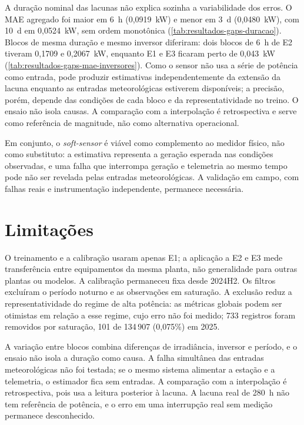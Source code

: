 A duração nominal das lacunas não explica sozinha a variabilidade dos erros. O
MAE agregado foi maior em 6~h (0,0919~kW) e menor em 3~d (0,0480~kW), com 10~d em
0,0524~kW, sem ordem monotônica (\cref{tab:resultados-gaps-duracao}). Blocos de
mesma duração e mesmo inversor diferiram: dois blocos de 6~h de E2 tiveram 0,1709
e 0,2067~kW, enquanto E1 e E3 ficaram perto de 0,043~kW
(\cref{tab:resultados-gaps-mae-inversores}). Como o sensor não usa a série de
potência como entrada, pode produzir estimativas independentemente da extensão da
lacuna enquanto as entradas meteorológicas estiverem disponíveis; a precisão,
porém, depende das condições de cada bloco e da representatividade no treino. O
ensaio não isola causas. A comparação com a interpolação é retrospectiva e serve
como referência de magnitude, não como alternativa operacional.

Em conjunto, o \textit{soft-sensor} é viável como complemento ao medidor físico,
não como substituto: a estimativa representa a geração esperada nas condições
observadas, e uma falha que interrompa geração e telemetria ao mesmo tempo pode
não ser revelada pelas entradas meteorológicas. A validação em campo, com falhas
reais e instrumentação independente, permanece necessária.

\section{Limitações}
\label{sec:limitacoes}

O treinamento e a calibração usaram apenas E1; a aplicação a E2 e E3 mede
transferência entre equipamentos da mesma planta, não generalidade para outras
plantas ou modelos. A calibração permaneceu fixa desde 2024H2. Os filtros
excluíram o período noturno e as observações em saturação. A exclusão reduz a
representatividade do regime de alta potência: as métricas globais podem ser
otimistas em relação a esse regime, cujo erro não foi medido; 733 registros foram
removidos por saturação, 101 de 134\,907 (0,075\%) em 2025.

A variação entre blocos combina diferenças de irradiância, inversor e período, e
o ensaio não isola a duração como causa. A falha simultânea das entradas
meteorológicas não foi testada; se o mesmo sistema alimentar a estação e a
telemetria, o estimador fica sem entradas. A comparação com a interpolação é
retrospectiva, pois usa a leitura posterior à lacuna. A lacuna real de 280~h não
tem referência de potência, e o erro em uma interrupção real sem medição
permanece desconhecido.

